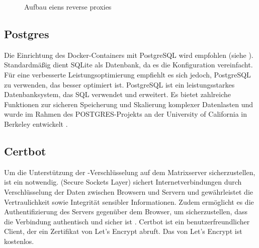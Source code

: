 \begin{figure}[H]
	\caption{Aufbau eiens reverse proxies}
\label{fig:patient_reverse_proxy}
\end{figure}

\subsection{Postgres}
Die Einrichtung des  Docker-Containers mit PostgreSQL wird empfohlen (siehe \cite{noauthor_installation_nodate}). Standardmäßig dient SQLite als Datenbank, da es die Konfiguration vereinfacht. Für eine verbesserte Leistungsoptimierung empfiehlt es sich jedoch, PostgreSQL zu verwenden, das besser optimiert ist. PostgreSQL ist ein leistungsstarkes Datenbanksystem, das SQL verwendet und erweitert. Es bietet zahlreiche Funktionen zur sicheren Speicherung und Skalierung komplexer Datenlasten und wurde im Rahmen des POSTGRES-Projekts an der University of California in Berkeley entwickelt \cite{noauthor_postgresql_nodate}.

\subsection{Certbot}
Um die Unterstützung der -Verschlüsselung auf dem Matrixserver sicherzustellen, ist ein  notwendig.  (Secure Sockets Layer) sichert Internetverbindungen durch Verschlüsselung der Daten zwischen Browsern und Servern und gewährleistet die Vertraulichkeit sowie Integrität sensibler Informationen. Zudem ermöglicht es die Authentifizierung des Servers gegenüber dem Browser, um sicherzustellen, dass die Verbindung authentisch und sicher ist \cite{SSL}. Certbot ist ein benutzerfreundlicher Client, der ein Zertifikat von Let's Encrypt abruft.  Das  von Let's Encrypt ist kostenlos. 

